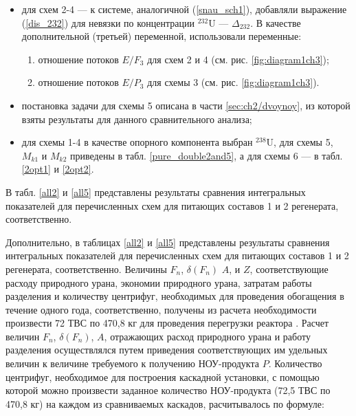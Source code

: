 \begin{itemize}
    \item для схем 2-4 --- к системе, аналогичной (\ref{snau_sch1}), добавляли выражение (\ref{dis_232}) для невязки по концентрации $^{232}$U --- $\Delta_{232}$. В качестве дополнительной (третьей) переменной, использовали переменные:
    \begin{enumerate}
        \item отношение потоков $E/{F_3}$ для схем 2 и 4 (см. рис. \ref{fig:diagram1ch3});
        \item отношение потоков $E/{P_3}$ для схемы 3 (см. рис. \ref{fig:diagram1ch3}).
    \end{enumerate}
    \item постановка задачи для схемы 5 описана в части \ref{sec:ch2/dvoynoy}, из которой взяты результаты для данного сравнительного анализа;
    \item для схемы 1-4 в качестве опорного компонента выбран $^{238}$U, для схемы 5, $M_{k1}$ и $M_{k2}$ приведены в табл. \ref{pure_double2and5}, а для схемы 6 --- в табл. \ref{2opt1} и \ref{2opt2}.
\end{itemize}

В табл. \ref{all2} и \ref{all5} представлены результаты сравнения интегральных показателей для перечисленных схем для питающих составов 1 и 2 регенерата, соответственно.

Дополнительно, в таблицах \ref{all2} и \ref{all5} представлены результаты сравнения интегральных показателей для перечисленных схем для питающих составов 1 и 2 регенерата, соответственно.
Величины $F_n$, $\delta(F_n)$ $A$, и $Z$, соответствующие расходу природного урана, экономии природного урана, затратам работы разделения и количеству центрифуг, необходимых для проведения обогащения в течение одного года, соответственно, получены из расчета необходимости произвести 72 ТВС по 470,8 кг для проведения перегрузки реактора \cite{BOBROVPovyshenieTehnikoekonomicheskihHarakteristik2019}. Расчет величин $F_n$, $\delta(F_n)$, $A$, отражающих расход природного урана и работу разделения осуществлялся путем приведения соответствующих им удельных величин к величине требуемого к получению НОУ-продукта $P$. Количество центрифуг, необходимое для построения каскадной установки, с помощью которой можно произвести заданное количество НОУ-продукта (72,5 ТВС по 470,8 кг) на каждом из сравниваемых каскадов, расчитывалось по формуле:

